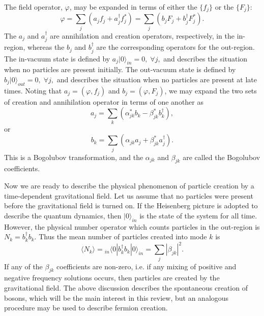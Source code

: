 \documentclass[eqsecnum,floats,aps,prd,floatfix,titlepage,tightenlines]{revtex4}
\begin{document}
The field operator, $\varphi$, may be expanded in terms of either the
$\{ f_j \}$ or the $\{ F_j \}$:
\begin{equation}
  \varphi = \sum\limits_j (a_j f_j + a_j^\dagger f_j^*)
  =\sum\limits_j (b_j F_j + b_j^\dagger F_j^*).
\end{equation}
The $a_j$ and $a_j^\dagger$ are annihilation and creation operators,
respectively, in the in-region, whereas the $b_j$ and $b_j^\dagger$
are the corresponding operators for the out-region. The in-vacuum state
is defined by $a_j|0\rangle_{in}=0, \; \forall j,$ and describes the
situation when no particles are present initially. The out-vacuum state
is defined by $b_j|0\rangle_{out}=0, \; \forall j,$ and describes the
situation when no particles are present at late times. Noting that
$a_j = (\varphi,f_j)$ and $b_j = (\varphi,F_j)$, we may expand the
two sets of creation and annihilation operator in terms of one another
as 
\begin{equation}
a_j=\sum\limits_k (\alpha _{jk}^*b_k-\beta _{jk}^* b_k^\dagger),
                                      \label{eq:Bogo1}
\end{equation}
or 
\begin{equation}
b_k=\sum\limits_j (\alpha _{jk} a_j + \beta _{jk}^* a _j^\dagger).
                                       \label{eq:Bogo2}
\end{equation}
This is a Bogolubov transformation, and the $\alpha_{jk}$ and
$\beta_{jk}$ are called the Bogolubov coefficients.

   Now we are ready to describe the physical phenomenon of particle
creation by a time-dependent gravitational field. Let us assume that
no particles were present before the gravitational field is turned on.
If the Heisenberg picture is adopted to describe the quantum dynamics,
then $|0\rangle_{in}$ is the state of the system for all time. However,
the physical number operator which counts particles in the out-region
is $N_k = b_k^\dagger b_k$. Thus the mean number of particles created
into mode $k$ is 
\begin{equation}
\langle N_k \rangle = {}_{in}\langle 0|b_k^\dagger b_k |0\rangle_{in}
       = \sum\limits_j |{\beta _{jk}}|^2.
 \label{eq:N}      
\end{equation}
If any of the $\beta_{jk}$ coefficients are non-zero, i.e. if
any mixing of positive and negative frequency solutions occurs, then
particles are created by the gravitational field.  The above discussion describes the 
spontaneous creation of bosons, which will be the main interest in this review,
but an analogous procedure may be used to describe fermion creation.
 
\end{document}
